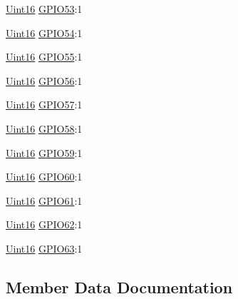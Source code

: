 \begin{DoxyCompactItemize}
\item 
\hyperlink{_d_s_p2833x___device_8h_a59a9f6be4562c327cbfb4f7e8e18f08b}{Uint16} \hyperlink{struct_g_p_b_d_a_t___b_i_t_s_a786342793680e6585244fd5f45767229}{G\+P\+I\+O53}\+:1
\item 
\hyperlink{_d_s_p2833x___device_8h_a59a9f6be4562c327cbfb4f7e8e18f08b}{Uint16} \hyperlink{struct_g_p_b_d_a_t___b_i_t_s_a2ba8aaccd966bfa5ce57f7711ca4e7fc}{G\+P\+I\+O54}\+:1
\item 
\hyperlink{_d_s_p2833x___device_8h_a59a9f6be4562c327cbfb4f7e8e18f08b}{Uint16} \hyperlink{struct_g_p_b_d_a_t___b_i_t_s_a4969b6aa7c66ef4cb1d40b18986e6981}{G\+P\+I\+O55}\+:1
\item 
\hyperlink{_d_s_p2833x___device_8h_a59a9f6be4562c327cbfb4f7e8e18f08b}{Uint16} \hyperlink{struct_g_p_b_d_a_t___b_i_t_s_a0c4741957a7c4ecf2f5a03b97adefc49}{G\+P\+I\+O56}\+:1
\item 
\hyperlink{_d_s_p2833x___device_8h_a59a9f6be4562c327cbfb4f7e8e18f08b}{Uint16} \hyperlink{struct_g_p_b_d_a_t___b_i_t_s_ab1c0510becb821e2c6bb35005aaf32e0}{G\+P\+I\+O57}\+:1
\item 
\hyperlink{_d_s_p2833x___device_8h_a59a9f6be4562c327cbfb4f7e8e18f08b}{Uint16} \hyperlink{struct_g_p_b_d_a_t___b_i_t_s_a18ab95d2009133fa4e2d04611ced8fd7}{G\+P\+I\+O58}\+:1
\item 
\hyperlink{_d_s_p2833x___device_8h_a59a9f6be4562c327cbfb4f7e8e18f08b}{Uint16} \hyperlink{struct_g_p_b_d_a_t___b_i_t_s_a4ad55f21f81e129a103d31665ee5a866}{G\+P\+I\+O59}\+:1
\item 
\hyperlink{_d_s_p2833x___device_8h_a59a9f6be4562c327cbfb4f7e8e18f08b}{Uint16} \hyperlink{struct_g_p_b_d_a_t___b_i_t_s_aa245bcd9ef310f44691565ac0895f48c}{G\+P\+I\+O60}\+:1
\item 
\hyperlink{_d_s_p2833x___device_8h_a59a9f6be4562c327cbfb4f7e8e18f08b}{Uint16} \hyperlink{struct_g_p_b_d_a_t___b_i_t_s_a91f775a7ee7035bc74564674013b6055}{G\+P\+I\+O61}\+:1
\item 
\hyperlink{_d_s_p2833x___device_8h_a59a9f6be4562c327cbfb4f7e8e18f08b}{Uint16} \hyperlink{struct_g_p_b_d_a_t___b_i_t_s_afb7e496d276f35e3984c5d73e8fa424d}{G\+P\+I\+O62}\+:1
\item 
\hyperlink{_d_s_p2833x___device_8h_a59a9f6be4562c327cbfb4f7e8e18f08b}{Uint16} \hyperlink{struct_g_p_b_d_a_t___b_i_t_s_aaaf38817c792270457c168a2d47b1232}{G\+P\+I\+O63}\+:1
\end{DoxyCompactItemize}


\subsection{Member Data Documentation}
\hypertarget{struct_g_p_b_d_a_t___b_i_t_s_a981125143e66de959da1abfd017fc312}{}

